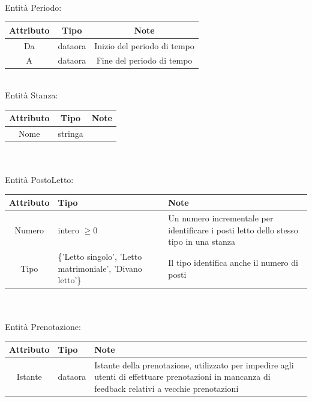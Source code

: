 \documentclass[a4paper,12pt]{report}
\begin{document}
      \vspace{24pt} \\
      Entità Periodo: \\
      \begin{tabular}{|c|c|c|}
        \hline Attributo & Tipo & Note \\
        \hline Da & dataora & Inizio del periodo di tempo \\
        \hline A & dataora & Fine del periodo di tempo \\
        \hline
      \end{tabular} \\
      \newpage
      Entità Stanza: \\
      \begin{tabular}{|c|c|c|}
        \hline Attributo & Tipo & Note \\
        \hline Nome & stringa & \\
        \hline
      \end{tabular} \\
      \vspace{24pt} \\
      Entità PostoLetto: \\
      \begin{tabular}{|c|p{}|p{}|}
        \hline Attributo & Tipo & Note \\
        \hline Numero & intero \(\geq 0\) & Un numero incrementale per identificare i posti letto dello stesso tipo in una stanza \\
        \hline Tipo & \{'Letto singolo', 'Letto matrimoniale', 'Divano letto'\} & Il tipo identifica anche il numero di posti \\
        \hline
      \end{tabular} \\
      \vspace{24pt} \\
      Entità Prenotazione: \\
      \begin{tabular}{|c|p{}|p{}|}
        \hline Attributo & Tipo & Note \\
        \hline Istante & dataora & Istante della prenotazione, utilizzato per impedire agli utenti di effettuare prenotazioni in mancanza di feedback relativi a vecchie prenotazioni \\
        \hline
      \end{tabular} \\
      \vspace{24pt} \\
\end{document}

